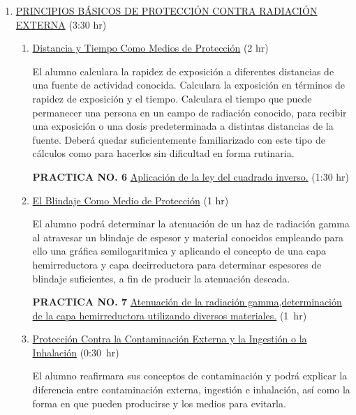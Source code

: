 \documentclass[11pt, oneside]{book}
\begin{document}
\begin{enumerate}
\begin{enumerate}[label*=\arabic*.]
        Memorizara el valor del limite de equivalente de dosis para
        trabajadores ocupacionalmente expuestos y los valore de rapidez de
        exposición en mr/hr y mr/semana que en promedio producirán dicho
        limite.
    \end{enumerate}
  \item \ul{PRINCIPIOS B\'ASICOS DE PROTECCI\'ON CONTRA RADIACI\'ON
    EXTERNA} \hfill (3:30 hr)
    \begin{enumerate}[label*=\arabic*.]
      \item \ul{Distancia y Tiempo Como Medios de Protecci\'on}
        \hfill (2 hr)

        El alumno calculara la rapidez de exposición a diferentes
        distancias de una fuente de actividad conocida. Calculara la
        exposición en términos de rapidez de exposición y el
        tiempo. Calculara el tiempo que puede permanecer una persona en un
        campo de radiación conocido, para recibir una exposición o una
        dosis predeterminada a distintas distancias de la fuente. Deberá
        quedar suficientemente familiarizado con este tipo de cálculos
        como para hacerlos sin dificultad en forma rutinaria.

        \textbf{PRACTICA NO. 6} \ul{Aplicaci\'on de la ley del cuadrado inverso.} \hfill (1:30 hr)

      \item \ul{El Blindaje Como Medio de Protecci\'on} \hfill (1 hr)

        El alumno podrá determinar la atenuación de un haz de radiación gamma
        al atravesar un blindaje de espesor y material conocidos empleando
        para ello una gráfica semilogaritmica y aplicando el concepto de
        una capa hemirreductora y capa decirreductora para determinar espesores
        de blindaje suficientes, a fin de producir la atenuación deseada.

        \textbf{PRACTICA NO. 7} \ul{Atenuaci\'on de la radiaci\'on gamma,determinaci\'on de la capa hemirreductora utilizando diversos materiales.}
        \hfill\mbox{(1 hr)}

      \item \ul{Protecci\'on Contra la Contaminaci\'on Externa y la Ingesti\'on o la Inhalaci\'on} \hfill\mbox{(0:30 hr)}

        El alumno reafirmara sus conceptos de contaminación y podrá
        explicar la diferencia entre contaminación externa, ingestión
        e inhalación, así como la forma en que pueden producirse y los
        medios para evitarla.


\end{enumerate}
\end{enumerate}
\end{document}
